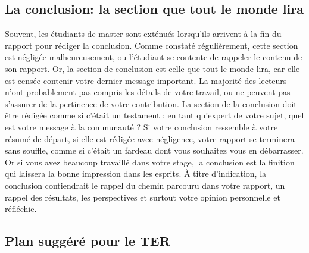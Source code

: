 \documentclass{rapport}
\begin{document}
      \subsection{La conclusion: la section que tout le monde lira} 
        Souvent, les étudiants de master sont exténués lorsqu'ils arrivent à la fin du rapport pour rédiger la conclusion. Comme constaté régulièrement, cette section est négligée malheureusement, ou l'étudiant se contente de rappeler le contenu de son rapport. Or, la section de conclusion est celle que tout le monde lira, car elle est censée contenir votre dernier message important. La majorité des lecteurs n'ont probablement pas compris les détails de votre travail, ou ne peuvent pas s'assurer de la pertinence de votre contribution. La section de la conclusion doit être rédigée comme si c'était un testament : en tant qu'expert de votre sujet, quel est votre message à la communauté ? Si votre conclusion ressemble à votre résumé de départ, si elle est rédigée avec négligence, votre rapport se terminera sans souffle, comme si c'était un fardeau dont vous souhaitez vous en débarrasser. Or si vous avez beaucoup travaillé dans votre stage, la conclusion est la finition qui laissera la bonne impression dans les esprits. À titre d'indication, la conclusion contiendrait le rappel du chemin parcouru dans votre rapport, un rappel des résultats, les perspectives et surtout votre opinion personnelle et réfléchie.
        
      \subsection{Plan suggéré pour le TER}
        
\end{document}
